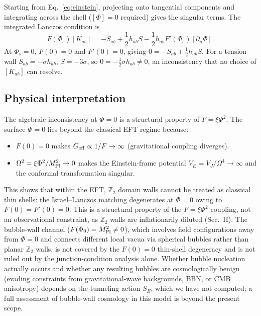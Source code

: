 \documentclass[pdflatex,sn-mathphys-num]{sn-jnl}
\newcommand{\MP}{M_{\rm Pl}}
\newcommand{\Ztwo}{\mathbb{Z}_2}
\newcommand{\PhiV}{\Phi_0}
\theoremstyle{thmstyleone}
\begin{document}
Starting from Eq.~\eqref{eq:einstein}, projecting onto tangential components and integrating across the shell ($[\Phi]=0$ required) gives the singular terms. The integrated Lanczos condition is
\begin{equation}
F(\Phi_s)[K_{ab}]=-S_{ab}+\frac12 h_{ab}S-\frac12 h_{ab}F'(\Phi_s)[\partial_n\Phi].
\label{eq:lanczos}
\end{equation}
At $\Phi_s=0$, $F(0)=0$ and $F'(0)=0$, giving $0=-S_{ab}+\frac12 h_{ab}S$. For a tension wall $S_{ab}=-\sigma h_{ab}$, $S=-3\sigma$, so $0=-\frac12\sigma h_{ab}\neq0$, an inconsistency that no choice of $[K_{ab}]$ can resolve.

\subsection{Physical interpretation}

The algebraic inconsistency at $\Phi=0$ is a structural property of $F=\xi\Phi^2$. The surface $\Phi=0$ lies beyond the classical EFT regime because:
\begin{itemize}
\item $F(0)=0$ makes $G_{\rm eff}\propto1/F\to\infty$ (gravitational coupling diverges).
\item $\Omega^2=\xi\Phi^2/\MP^2\to0$ makes the Einstein-frame potential $V_E=V_J/\Omega^4\to\infty$ and the conformal transformation singular.
\end{itemize}
This shows that within the EFT, $\Ztwo$ domain walls cannot be treated as classical thin shells: the Israel--Lanczos matching degenerates at $\Phi=0$ owing to $F(0)=F'(0)=0$. This is a structural property of the $F=\xi\Phi^2$ coupling, not an observational constraint, as $\Ztwo$ walls are inflationarily diluted (Sec.~II). The bubble-wall channel ($F(\PhiV)=\MP^2\neq0$), which involves field configurations away from $\Phi=0$ and connects different local vacua via spherical bubbles rather than planar $\Ztwo$ walls, is not covered by the $F(0)=0$ thin-shell degeneracy and is not ruled out by the junction-condition analysis alone. Whether bubble nucleation actually occurs and whether any resulting bubbles are cosmologically benign (evading constraints from gravitational-wave backgrounds, BBN, or CMB anisotropy) depends on the tunneling action $S_E$, which we have not computed; a full assessment of bubble-wall cosmology in this model is beyond the present scope.
\end{document}
